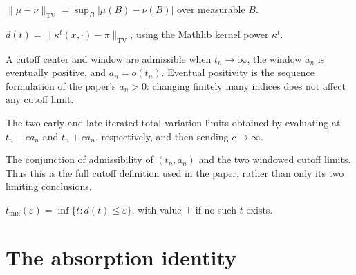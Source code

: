 \begin{definition}
  \label{def:tvdist}
  \leanok
  $\|\mu-\nu\|_{\mathrm{TV}} = \sup_{B}|\mu(B)-\nu(B)|$ over measurable $B$.
\end{definition}

\begin{definition}
  \label{def:dseq}
  \leanok
  $d(t) = \|\kappa^t(x,\cdot) - \pi\|_{\mathrm{TV}}$, using the Mathlib kernel
  power $\kappa^t$.
\end{definition}

\begin{definition}
  \label{def:cutoff-window}
  \leanok
  A cutoff center and window are admissible when $t_n\to\infty$, the window
  $a_n$ is eventually positive, and $a_n=o(t_n)$. Eventual positivity is the
  sequence formulation of the paper's $a_n>0$: changing finitely many indices
  does not affect any cutoff limit.
\end{definition}

\begin{definition}
  \label{def:cutoff-limits}
  \leanok
  The two early and late iterated total-variation limits obtained by evaluating
  at $t_n-ca_n$ and $t_n+ca_n$, respectively, and then sending $c\to\infty$.
\end{definition}

\begin{definition}
  \label{def:cutoff}
  \leanok
  The conjunction of admissibility of $(t_n,a_n)$ and the two windowed cutoff
  limits. Thus this is the full cutoff definition used in the paper, rather than
  only its two limiting conclusions.
\end{definition}

\begin{definition}
  \label{def:mixing}
  \leanok
  $t_{\mathrm{mix}}(\varepsilon) = \inf\{t : d(t)\le\varepsilon\}$, with value
  $\top$ if no such $t$ exists.
\end{definition}

\section{The absorption identity}

